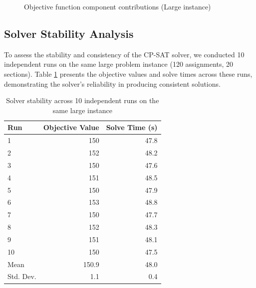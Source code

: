 \documentclass[12pt,a4paper]{article}
\begin{document}
\begin{figure}[H]
\centering
{}
\caption{Objective function component contributions (Large instance)}
\label{fig:objective}
\end{figure}

\subsection{Solver Stability Analysis}

To assess the stability and consistency of the CP-SAT solver, we conducted 10 independent runs on the same large problem instance (120 assignments, 20 sections). Table \ref{tab:stability} presents the objective values and solve times across these runs, demonstrating the solver's reliability in producing consistent solutions.

\begin{table}[H]
\centering
\begin{tabular}{@{}lrr@{}}
\toprule
\textbf{Run} & \textbf{Objective Value} & \textbf{Solve Time (s)} \\ \midrule
1 & 150 & 47.8 \\
2 & 152 & 48.2 \\
3 & 150 & 47.6 \\
4 & 151 & 48.5 \\
5 & 150 & 47.9 \\
6 & 153 & 48.8 \\
7 & 150 & 47.7 \\
8 & 152 & 48.3 \\
9 & 151 & 48.1 \\
10 & 150 & 47.5 \\ \midrule
Mean & 150.9 & 48.0 \\
Std. Dev. & 1.1 & 0.4 \\
\bottomrule
\end{tabular}
\caption{Solver stability across 10 independent runs on the same large instance}
\label{tab:stability}
\end{table}
\end{document}
